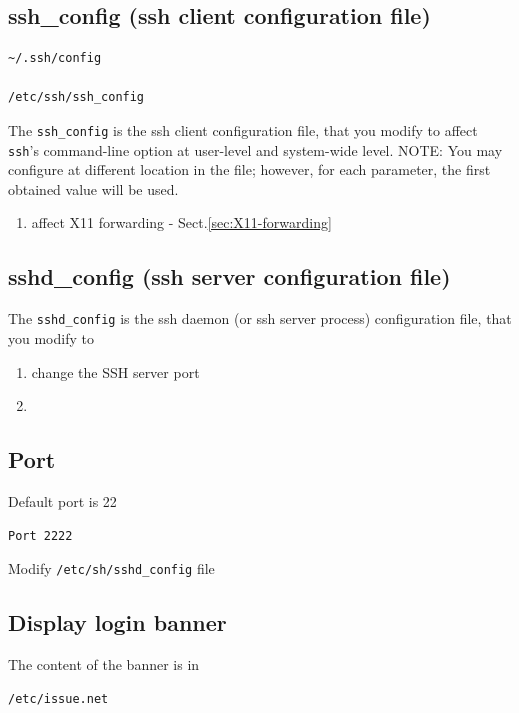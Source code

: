 \subsection{ssh\_config (ssh client configuration file)}
\label{sec:ssh_config}

\begin{verbatim}
~/.ssh/config

/etc/ssh/ssh_config
\end{verbatim}

The \verb!ssh_config! is the ssh client configuration
file, that you modify to affect \verb!ssh!'s command-line option at user-level
and system-wide level. NOTE: You may configure at different location in the
file; however, for each parameter, the first obtained value will be used. 

\begin{enumerate}
  \item affect X11 forwarding - Sect.\ref{sec:X11-forwarding}
\end{enumerate}


\subsection{sshd\_config (ssh server configuration file)}
\label{sec:sshd_config}

The \verb!sshd_config! is the ssh daemon (or ssh server process) configuration
file, that you modify to
\begin{enumerate}
  \item change the SSH server port
  
  \item 
\end{enumerate}


\subsection{Port}

Default port is 22
\begin{verbatim}
Port 2222
\end{verbatim}
Modify \verb!/etc/sh/sshd_config! file

\subsection{Display login banner}

The content of the banner is in
\begin{verbatim}
/etc/issue.net 
\end{verbatim}

